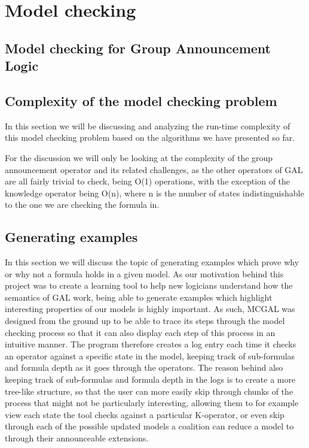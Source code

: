 %

\section{Model checking}\label{sec:impl}


\subsection{Model checking for Group Announcement Logic}



\subsection{Complexity of the model checking problem}

In this section we will be discussing and analyzing the run-time complexity of this model checking problem based on the algorithms we have presented so far.

For the discussion we will only be looking at the complexity of the group announcement operator and its related challenges, as the other operators of GAL are all fairly trivial to check, being O(1) operations, with the exception of the knowledge operator being O(n), where n is the number of states indistinguishable to the one we are checking the formula in.

\subsection{Generating examples}


In this section we will discuss the topic of generating examples which prove why or why not a formula holds in a given model. As our motivation behind this project was to create a learning tool to help new logicians understand how the semantics of GAL work, being able to generate examples which highlight interesting properties of our models is highly important. As such, MCGAL was designed from the ground up to be able to trace its steps through the model checking process so that it can also display each step of this process in an intuitive manner. The program therefore creates a log entry each time it checks an operator against a specific state in the model, keeping track of sub-formulas and formula depth as it goes through the operators. The reason behind also keeping track of sub-formulas and formula depth in the logs is to create a more tree-like structure, so that the user can more easily skip through chunks of the process that might not be particularly interesting, allowing them to for example view each state the tool checks against a particular K-operator, or even skip through each of the possible updated models a coalition can reduce a model to through their announceable extensions.

